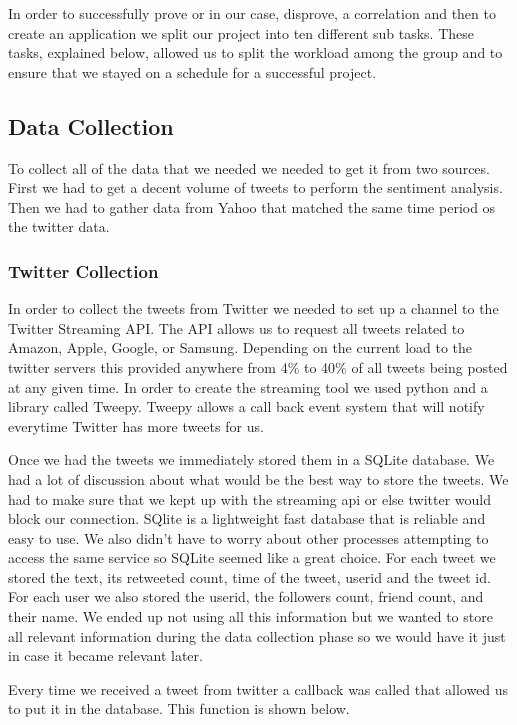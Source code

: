 \documentclass{acm_proc_article-sp}
\begin{document}
In order to successfully prove or in our case, disprove, a correlation and then
to create an application we split our project into ten different sub tasks.
These tasks, explained below, allowed us to split the workload among the group
and to ensure that we stayed on a schedule for a successful project.

\subsection{Data Collection} 

To collect all of the data that we needed we needed to get it from two sources.
First we had to get a decent volume of tweets to perform the sentiment
analysis. Then we had to gather data from Yahoo that matched the same time
period os the twitter data.

\subsubsection{Twitter Collection} 

In order to collect the tweets from Twitter we needed to set up a channel to
the Twitter Streaming API. The API allows us to request all tweets related to
Amazon, Apple, Google, or Samsung. Depending on the current load to the twitter
servers this provided anywhere from 4\% to 40\% of all tweets being posted at
any given time. In order to create the streaming tool we used python and a library
called Tweepy. Tweepy allows a call back event system that will notify everytime
Twitter has more tweets for us. 

Once we had the tweets we immediately stored them in a SQLite database.  We had
a lot of discussion about what would be the best way to store the tweets. We
had to make sure that we kept up with the streaming api or else twitter would
block our connection. SQlite is a lightweight fast database that is reliable
and easy to use. We also didn't have to worry about other processes attempting
to access the same service so SQLite seemed like a great choice. For each tweet
we stored the text, its retweeted count, time of the tweet, userid and the
tweet id. For each user we also stored the userid, the followers count, friend
count, and their name. We ended up not using all this information but we wanted
to store all relevant information during the data collection phase so we would
have it just in case it became relevant later. 

Every time we received a tweet from twitter a callback was called that allowed
us to put it in the database. This function is shown below.
\end{document}
